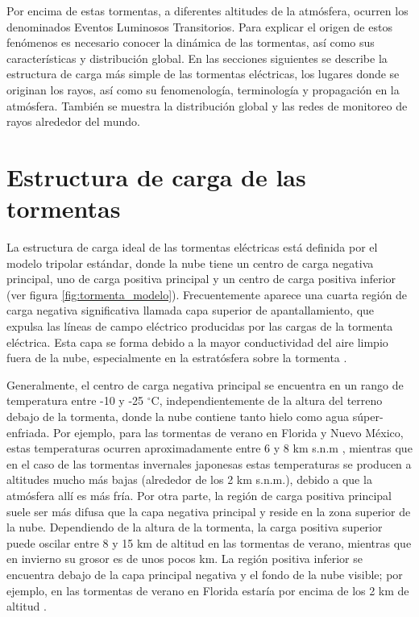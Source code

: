 \documentclass[12pt,oneside,openany,letter]{book}
\begin{document}
Por encima de estas tormentas, a diferentes altitudes de la atmósfera, ocurren los denominados Eventos Luminosos Transitorios. Para explicar el origen de estos fenómenos es necesario conocer la dinámica de las tormentas, así como sus características y distribución global. En las secciones siguientes se describe la estructura de carga más simple de las tormentas eléctricas, los lugares donde se originan los rayos, así como su fenomenología, terminología y propagación en la atmósfera. También se muestra la distribución global y las redes de monitoreo de rayos alrededor del mundo.  

\section{Estructura de carga de las tormentas}
La estructura de carga ideal de las tormentas eléctricas está definida por el modelo tripolar estándar, donde la nube tiene un centro de carga negativa principal, uno de carga positiva principal y un centro de carga positiva inferior (ver figura \ref{fig:tormenta_modelo}). Frecuentemente aparece una cuarta región de carga negativa significativa llamada capa superior de apantallamiento, que expulsa las líneas de campo eléctrico producidas por las cargas de la tormenta eléctrica. Esta capa se forma debido a la mayor conductividad del aire limpio fuera de la nube, especialmente en la estratósfera sobre la tormenta \cite{DwyerUman2014}. 

Generalmente, el centro de carga negativa principal se encuentra en un rango de temperatura entre -10 y -25 $^{\circ}$C, independientemente de la altura del terreno debajo de la tormenta, donde la nube contiene tanto hielo como agua súper-enfriada. Por ejemplo, para las tormentas de verano en Florida y Nuevo México, estas temperaturas ocurren aproximadamente entre 6 y 8 km s.n.m \cite{DwyerUman2014}, mientras que en el caso de las tormentas invernales japonesas estas temperaturas se producen a altitudes mucho más bajas (alrededor de los 2 km s.n.m.), debido a que la atmósfera allí es más fría. 
Por otra parte, la región de carga positiva principal suele ser más difusa que la capa negativa principal y reside en la zona superior de la nube. Dependiendo de la altura de la tormenta, la carga positiva superior puede oscilar entre 8 y 15 km de altitud en las tormentas de verano, mientras que en invierno su grosor es de unos pocos km. La región positiva inferior se encuentra debajo de la capa principal negativa y el fondo de la nube visible; por ejemplo, en las tormentas de verano en Florida estaría por encima de los 2 km de altitud \cite{DwyerUman2014}. 
\end{document}
